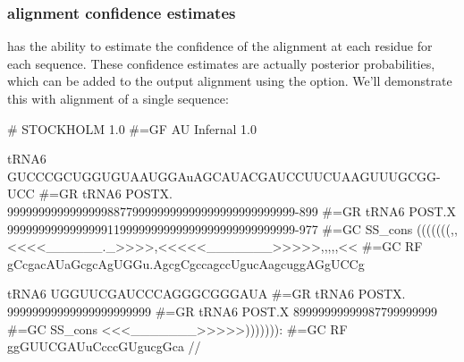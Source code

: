 \subsubsection{alignment confidence estimates}
 has the ability to estimate the confidence of the
alignment at each residue for each sequence. These confidence estimates
are actually posterior probabilities, which can be added to
the output alignment using the  option. We'll demonstrate
this with alignment of a single sequence:

\begin{sreoutput}
# STOCKHOLM 1.0
#=GF AU Infernal 1.0

tRNA6             GUCCCGCUGGUGUAAUGGAuAGCAUACGAUCCUUCUAAGUUUGCGG-UCC
#=GR tRNA6 POSTX. 9999999999999999887799999999999999999999999999-899
#=GR tRNA6 POST.X 9999999999999999119999999999999999999999999999-977
#=GC SS_cons      (((((((,,<<<<______._>>>>,<<<<<_______>>>>>,,,,,<<
#=GC RF           gCcgacAUaGcgcAgUGGu.AgcgCgccagccUgucAagcuggAGgUCCg

tRNA6             UGGUUCGAUCCCAGGGCGGGAUA
#=GR tRNA6 POSTX. 99999999999999999999999
#=GR tRNA6 POST.X 89999999999987799999999
#=GC SS_cons      <<<_______>>>>>))))))):
#=GC RF           ggGUUCGAUuCcccGUgucgGca
//
\end{sreoutput}

